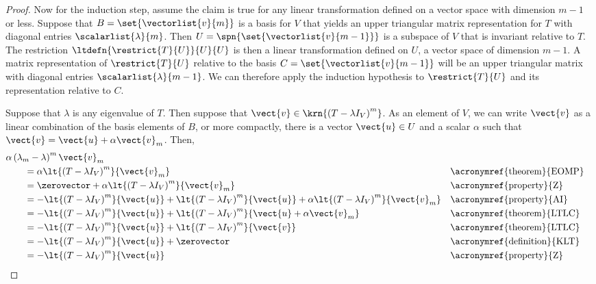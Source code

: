 \begin{proof}
%
Now for the induction step, assume the claim is true for any linear transformation defined on a vector space with dimension $m-1$ or less.  Suppose that $B=\set{\vectorlist{v}{m}}$ is a basis for $V$ that yields an upper triangular matrix representation for $T$ with diagonal entries $\scalarlist{\lambda}{m}$.   Then $U=\spn{\set{\vectorlist{v}{m-1}}}$ is a subspace of $V$ that is invariant relative to $T$.  The restriction $\ltdefn{\restrict{T}{U}}{U}{U}$ is then a linear transformation defined on $U$, a vector space of dimension $m-1$.  A matrix representation of $\restrict{T}{U}$ relative to the basis $C=\set{\vectorlist{v}{m-1}}$ will be an upper triangular matrix with diagonal entries $\scalarlist{\lambda}{m-1}$.  We can therefore apply the induction hypothesis to $\restrict{T}{U}$ and its representation relative to $C$.\par
%
Suppose that $\lambda$ is any eigenvalue of $T$.  Then suppose that $\vect{v}\in\krn{\left(T-\lambda I_V\right)^m}$.  As an element of $V$, we can write $\vect{v}$ as a linear combination of the basis elements of $B$, or more compactly, there is a vector $\vect{u}\in U$ and a scalar $\alpha$ such that $\vect{v}=\vect{u}+\alpha\vect{v}_m$.  Then,
%
\begin{align*}
&\alpha\left(\lambda_m-\lambda\right)^m\vect{v}_m\\
&\quad\quad=
\alpha\lt{\left(T-\lambda I_V\right)^m}{\vect{v}_m}&&\text{\acronymref{theorem}{EOMP}}\\
%
&\quad\quad=
\zerovector+
\alpha\lt{\left(T-\lambda I_V\right)^m}{\vect{v}_m}&&\text{\acronymref{property}{Z}}\\
%
&\quad\quad=
-\lt{\left(T-\lambda I_V\right)^m}{\vect{u}}+
\lt{\left(T-\lambda I_V\right)^m}{\vect{u}}+
\alpha\lt{\left(T-\lambda I_V\right)^m}{\vect{v}_m}&&\text{\acronymref{property}{AI}}\\
%
&\quad\quad=
-\lt{\left(T-\lambda I_V\right)^m}{\vect{u}}+
\lt{\left(T-\lambda I_V\right)^m}{\vect{u}+\alpha\vect{v}_m}&&\text{\acronymref{theorem}{LTLC}}\\
%
&\quad\quad=
-\lt{\left(T-\lambda I_V\right)^m}{\vect{u}}+
\lt{\left(T-\lambda I_V\right)^m}{\vect{v}}&&\text{\acronymref{theorem}{LTLC}}\\
%
&\quad\quad=
-\lt{\left(T-\lambda I_V\right)^m}{\vect{u}}+\zerovector
&&\text{\acronymref{definition}{KLT}}\\
%
&\quad\quad=
-\lt{\left(T-\lambda I_V\right)^m}{\vect{u}}
&&\text{\acronymref{property}{Z}}\\
%
\end{align*}

\end{proof}
